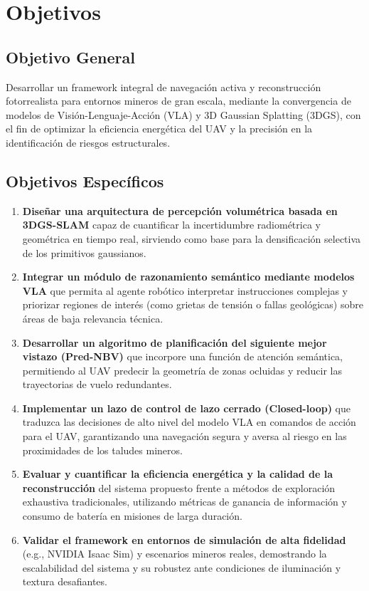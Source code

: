 \documentclass[12pt,a4paper]{article}
\begin{document}
	
	
	
	\section{Objetivos}
	
	\subsection{Objetivo General}
	Desarrollar un framework integral de navegación activa y reconstrucción fotorrealista para entornos mineros de gran escala, mediante la convergencia de modelos de Visión-Lenguaje-Acción (VLA) y 3D Gaussian Splatting (3DGS), con el fin de optimizar la eficiencia energética del UAV y la precisión en la identificación de riesgos estructurales.
	
	\subsection{Objetivos Específicos}
	\begin{enumerate}
		\item \textbf{Diseñar una arquitectura de percepción volumétrica basada en 3DGS-SLAM} capaz de cuantificar la incertidumbre radiométrica y geométrica en tiempo real, sirviendo como base para la densificación selectiva de los primitivos gaussianos.
		
		\item \textbf{Integrar un módulo de razonamiento semántico mediante modelos VLA} que permita al agente robótico interpretar instrucciones complejas y priorizar regiones de interés (como grietas de tensión o fallas geológicas) sobre áreas de baja relevancia técnica.
		
		\item \textbf{Desarrollar un algoritmo de planificación del siguiente mejor vistazo (Pred-NBV)} que incorpore una función de atención semántica, permitiendo al UAV predecir la geometría de zonas ocluidas y reducir las trayectorias de vuelo redundantes.
		
		\item \textbf{Implementar un lazo de control de lazo cerrado (Closed-loop)} que traduzca las decisiones de alto nivel del modelo VLA en comandos de acción para el UAV, garantizando una navegación segura y aversa al riesgo en las proximidades de los taludes mineros.
		
		\item \textbf{Evaluar y cuantificar la eficiencia energética y la calidad de la reconstrucción} del sistema propuesto frente a métodos de exploración exhaustiva tradicionales, utilizando métricas de ganancia de información y consumo de batería en misiones de larga duración.
		
		\item \textbf{Validar el framework en entornos de simulación de alta fidelidad} (e.g., NVIDIA Isaac Sim) y escenarios mineros reales, demostrando la escalabilidad del sistema y su robustez ante condiciones de iluminación y textura desafiantes.
	\end{enumerate}
	
\end{document}
